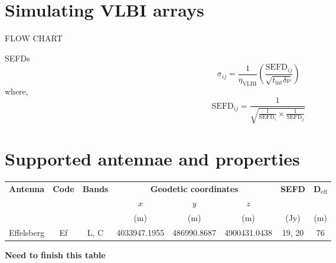\documentclass[11pt]{report_jfr}
\begin{document}
\section{Simulating VLBI arrays}

FLOW CHART

SEFDs
\begin{equation}
	\mathrm{\sigma}_{ij} = \frac{1}{\eta_\mathrm{VLBI}}\left(\frac{\mathrm{SEFD}_{ij}}{\sqrt{t_\mathrm{int}\delta\nu}}\right)
\end{equation}
where, 
\begin{equation}
	\mathrm{SEFD}_{ij} = \frac{1}{{\sqrt{\frac{1}{\mathrm{SEFD}_i}\times\frac{1}{\mathrm{SEFD}_j}}}}
\end{equation}

\appendix

\section{Supported antennae and properties}\label{a:supported_antennae}

\begin{longtable}{cccccccc}
	\toprule
	\textbf{Antenna} & \textbf{Code} & \textbf{Bands} & \multicolumn{3}{c}{\textbf{Geodetic coordinates}} & \textbf{SEFD} & $\boldsymbol{D}_\mathrm{eff}$\\
	& & & $x$ & $y$ & $z$ & & \\
	& & & (m) & (m) & (m) & (Jy) & (m) \\
	\hline\endhead
	Effelsberg & Ef & L, C & 4033947.1955 & 486990.8687 & 4900431.0438 & 19, 20 & 76 \\
\end{longtable}
\textbf{Need to finish this table}
\end{document}
